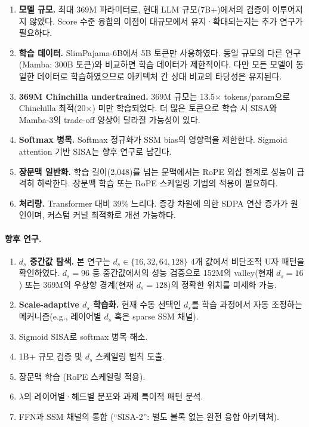 \documentclass[11pt]{article}
\begin{document}
\begin{enumerate}[leftmargin=*]
\item \textbf{모델 규모.} 최대 369M 파라미터로, 현대 LLM 규모(7B+)에서의 검증이 이루어지지 않았다. Score 수준 융합의 이점이 대규모에서 유지·확대되는지는 추가 연구가 필요하다.

\item \textbf{학습 데이터.} SlimPajama-6B에서 5B 토큰만 사용하였다. 동일 규모의 다른 연구(Mamba: 300B 토큰)와 비교하면 학습 데이터가 제한적이다. 다만 모든 모델이 동일한 데이터로 학습하였으므로 아키텍처 간 상대 비교의 타당성은 유지된다.

\item \textbf{369M Chinchilla undertrained.} 369M 규모는 13.5$\times$ tokens/param으로 Chinchilla 최적(20$\times$) 미만 학습되었다. 더 많은 토큰으로 학습 시 SISA와 Mamba-3의 trade-off 양상이 달라질 가능성이 있다.

\item \textbf{Softmax 병목.} Softmax 정규화가 SSM bias의 영향력을 제한한다. Sigmoid attention 기반 SISA는 향후 연구로 남긴다.

\item \textbf{장문맥 일반화.} 학습 길이(2,048)를 넘는 문맥에서는 RoPE 외삽 한계로 성능이 급격히 하락한다. 장문맥 학습 또는 RoPE 스케일링 기법의 적용이 필요하다.

\item \textbf{처리량.} Transformer 대비 39\% 느리다. 증강 차원에 의한 SDPA 연산 증가가 원인이며, 커스텀 커널 최적화로 개선 가능하다.
\end{enumerate}

\paragraph{향후 연구.}
\begin{enumerate}[leftmargin=*]
\item \textbf{$d_s$ 중간값 탐색.} 본 연구는 $d_s \in \{16, 32, 64, 128\}$ 4개 값에서 비단조적 U자 패턴을 확인하였다. $d_s = 96$ 등 중간값에서의 성능 검증으로 152M의 valley(현재 $d_s=16$) 또는 369M의 우상향 경계(현재 $d_s=128$)의 정확한 위치를 미세화 가능.
\item \textbf{Scale-adaptive $d_s$ 학습화.} 현재 수동 선택인 $d_s$를 학습 과정에서 자동 조정하는 메커니즘(e.g., 레이어별 $d_s$ 혹은 sparse SSM 채널).
\item Sigmoid SISA로 softmax 병목 해소.
\item 1B+ 규모 검증 및 $d_s$ 스케일링 법칙 도출.
\item 장문맥 학습 (RoPE 스케일링 적용).
\item $\lambda$의 레이어별·헤드별 분포와 과제 특이적 패턴 분석.
\item FFN과 SSM 채널의 통합 (``SISA-2'': 별도 블록 없는 완전 융합 아키텍처).
\end{enumerate}
\end{document}
